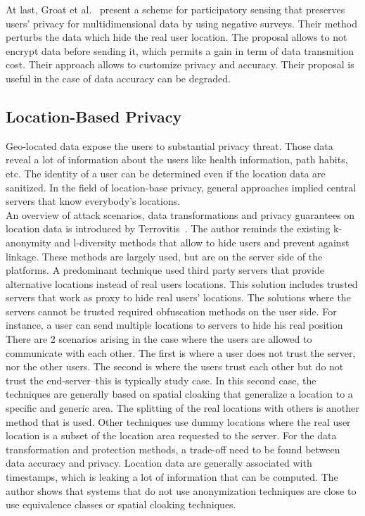 At last, Groat et al.~\cite{DBLP:conf/percom/GroatEHHF12} present a scheme for participatory sensing that preserves users' privacy for multidimensional data by using negative surveys.
Their method perturbs the data which hide the real user location.
The proposal allows to not encrypt data before sending it, which permits a gain in term of data transmition cost.
Their approach allows to customize privacy and accuracy.
Their proposal is useful in the case of data accuracy can be degraded.

\subsection{Location-Based Privacy}

Geo-located data expose the users to substantial privacy threat.
Those data reveal a lot of information about the users like health information, path habits, etc.
The identity of a user can be determined even if the location data are sanitized.
In the field of location-base privacy, general approaches implied central servers that know everybody's locations.
\\

An overview of attack scenarios, data transformations and privacy guarantees on location data is introduced by Terrovitis~\cite{DBLP:journals/sigkdd/Terrovitis11}.
The author reminds the existing k-anonymity and l-diversity methods that allow to hide users and prevent against linkage.
These methods are largely used, but are on the server side of the platforms.
A predominant technique used third party servers that provide alternative locations instead of real users locations.
This solution includes trusted servers that work as proxy to hide real users' locations.
The solutions where the servers cannot be trusted required obfuscation methods on the user side.
For instance, a user can send multiple locations to servers to hide his real position
There are 2 scenarios arising in the case where the users are allowed to communicate with each other.
The first is where a user does not trust the server, nor the other users.
The second is where the users trust each other but do not trust the end-server--this is typically study case.
In this second case, the techniques are generally based on spatial cloaking that generalize a location to a specific and generic area.
The splitting of the real locations with others is another method that is used.
Other techniques use dummy locations where the real user location is a subset of the location area requested to the server.
For the data transformation and protection methods, a trade-off need to be found between data accuracy and privacy.
Location data are generally associated with timestamps, which is leaking a lot of information that can be computed.
The author shows that systems that do not use anonymization techniques are close to use equivalence classes or spatial cloaking techniques.
\\

